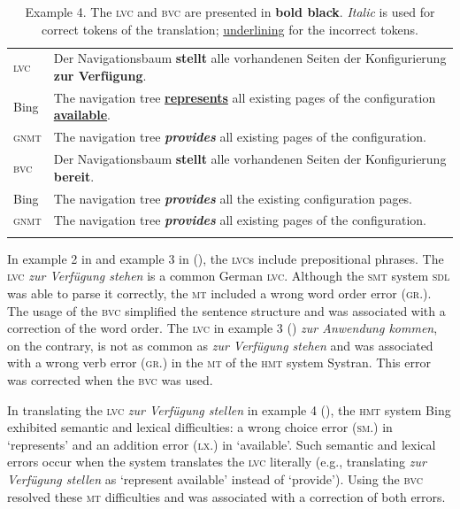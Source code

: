 \documentclass[output=paper]{langsci/langscibook}
\begin{document}
\begin{table}[p]
\caption{Example 4. The \textsc{lvc} and \textsc{bvc} are presented in \textbf{bold black}. \textit{Italic} is used for correct tokens of the translation; \uline{underlining} for the incorrect tokens.\label{marzouk:table5}}
\begin{tabularx}{\textwidth}{lQ}
\lsptoprule
\textsc{lvc}&Der Navigationsbaum \textbf{stellt} alle vorhandenen Seiten der Konfigurierung \textbf{zur Verfügung}.\\
Bing &The navigation tree \uline{\textbf{represents}} all existing pages of the configuration \uline{\textbf{available}}.\\
\textsc{gnmt}&The navigation tree \textit{\textbf{provides}} all existing pages of the configuration.\\
\midrule
\textsc{bvc}&Der Navigationsbaum \textbf{stellt	} alle vorhandenen Seiten der Konfigurierung \textbf{bereit}.\\
Bing&The navigation tree \textbf{\textit{provides}} all the existing configuration pages.\\
\textsc{gnmt}&The navigation tree \textit{\textbf{provides}} all existing pages of the configuration.\\
\lspbottomrule
\end{tabularx}
\end{table}


In example 2 in  and example 3 in (), the \textsc{lvc}s include prepositional phrases. The \textsc{lvc} \textit{zur Verfügung stehen} is a common German \textsc{lvc}. Although the \textsc{smt} system \textsc{sdl} was able to parse it correctly, the \textsc{mt} included a wrong word order error (\textsc{gr}.). The usage of the \textsc{bvc} simplified the sentence structure and was associated with a correction of the word order. The \textsc{lvc} in example 3 () \textit{zur Anwendung kommen}, on the contrary, is not as common as \textit{zur Verfügung stehen} and was associated with a wrong verb error (\textsc{gr}.) in the \textsc{mt} of the \textsc{hmt} system Systran. This error was corrected when the \textsc{bvc} was used.


In translating the \textsc{lvc} \textit{zur Verfügung stellen} in example 4 (), the \textsc{hmt} system Bing exhibited semantic and lexical difficulties: a wrong choice error (\textsc{sm}.) in ‘represents’ and an addition error (\textsc{lx}.) in ‘available’. Such semantic and lexical errors occur when the system translates the \textsc{lvc} literally (e.g., translating \textit{zur Verfügung stellen} as ‘represent available’ instead of ‘provide’). Using the \textsc{bvc} resolved these \textsc{mt} difficulties and was associated with a correction of both errors.
\end{document}
